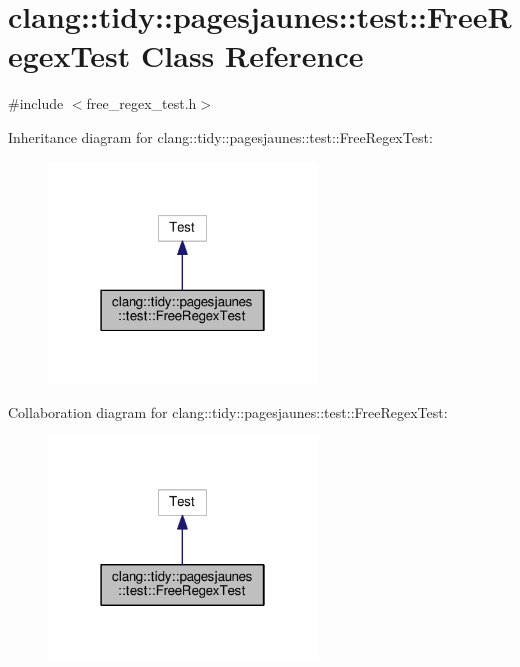 \hypertarget{classclang_1_1tidy_1_1pagesjaunes_1_1test_1_1_free_regex_test}{}\section{clang\+:\+:tidy\+:\+:pagesjaunes\+:\+:test\+:\+:Free\+Regex\+Test Class Reference}
\label{classclang_1_1tidy_1_1pagesjaunes_1_1test_1_1_free_regex_test}


{\ttfamily \#include $<$free\+\_\+regex\+\_\+test.\+h$>$}



Inheritance diagram for clang\+:\+:tidy\+:\+:pagesjaunes\+:\+:test\+:\+:Free\+Regex\+Test\+:
\nopagebreak
\begin{figure}[H]
\begin{center}
\leavevmode
\includegraphics[width=202pt]{classclang_1_1tidy_1_1pagesjaunes_1_1test_1_1_free_regex_test__inherit__graph}
\end{center}
\end{figure}


Collaboration diagram for clang\+:\+:tidy\+:\+:pagesjaunes\+:\+:test\+:\+:Free\+Regex\+Test\+:
\nopagebreak
\begin{figure}[H]
\begin{center}
\leavevmode
\includegraphics[width=202pt]{classclang_1_1tidy_1_1pagesjaunes_1_1test_1_1_free_regex_test__coll__graph}
\end{center}
\end{figure}

